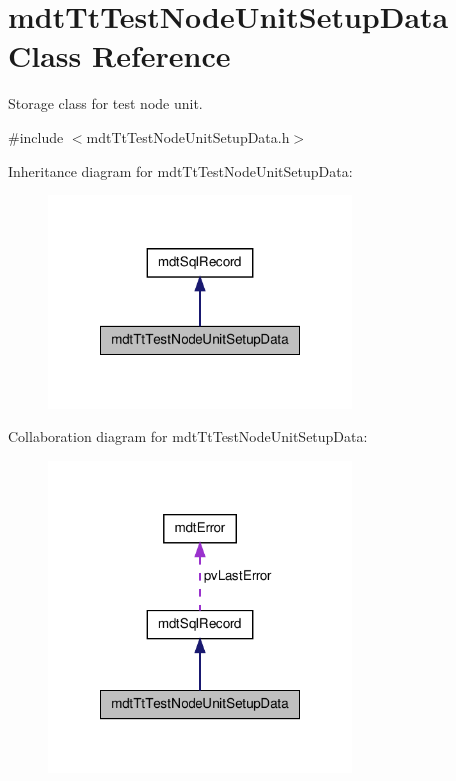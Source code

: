 \hypertarget{classmdt_tt_test_node_unit_setup_data}{\section{mdt\-Tt\-Test\-Node\-Unit\-Setup\-Data Class Reference}
\label{classmdt_tt_test_node_unit_setup_data}
}


Storage class for test node unit.  




{\ttfamily \#include $<$mdt\-Tt\-Test\-Node\-Unit\-Setup\-Data.\-h$>$}



Inheritance diagram for mdt\-Tt\-Test\-Node\-Unit\-Setup\-Data\-:\nopagebreak
\begin{figure}[H]
\begin{center}
\leavevmode
\includegraphics[width=228pt]{classmdt_tt_test_node_unit_setup_data__inherit__graph}
\end{center}
\end{figure}


Collaboration diagram for mdt\-Tt\-Test\-Node\-Unit\-Setup\-Data\-:\nopagebreak
\begin{figure}[H]
\begin{center}
\leavevmode
\includegraphics[width=228pt]{classmdt_tt_test_node_unit_setup_data__coll__graph}
\end{center}
\end{figure}
